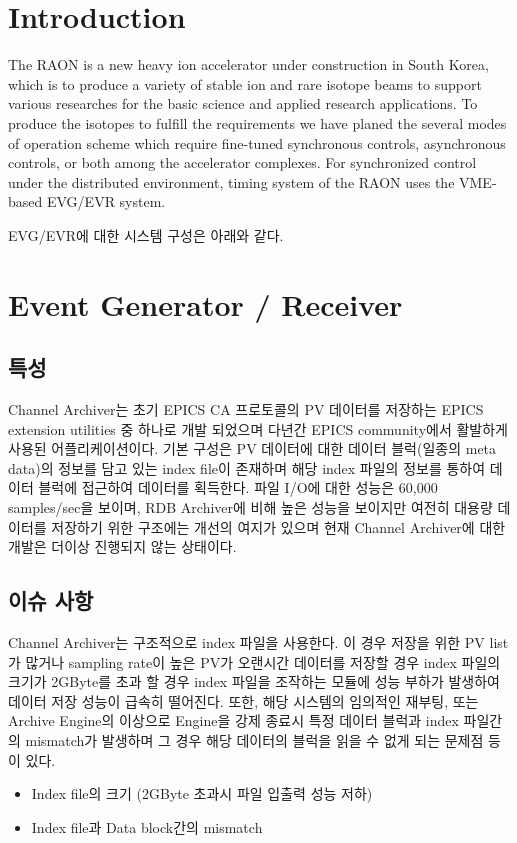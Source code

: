 \documentclass[11pt
-  , a4paper
  , article
  , oneside
]{memoir}
\begin{document}
\begin{multicols}{2}
	
	
\chapter{Introduction}
The RAON\cite{TSHOO:NIMB} is a new heavy ion accelerator under construction in South Korea, which is to produce a variety of stable ion and rare isotope beams to support various researches for the basic science and applied research applications. To produce the isotopes to fulfill the requirements we have planed the several modes of operation scheme which require fine-tuned synchronous controls, asynchronous controls, or both among the accelerator complexes. For synchronized control under the distributed environment, timing system of the RAON uses the VME-based EVG/EVR system. 

EVG/EVR에 대한 시스템 구성은 아래와 같다.



\chapter{Event Generator / Receiver}
\section{특성}
Channel Archiver\cite{archiver}는 초기 EPICS CA 프로토콜의 PV 데이터를 저장하는 EPICS extension utilities 중 하나로 개발 되었으며 다년간 EPICS community에서 활발하게 사용된 어플리케이션이다. 기본 구성은 PV 데이터에 대한 데이터 블럭(일종의 meta data)의 정보를 담고 있는 index file이 존재하며 해당 index 파일의 정보를 통하여 데이터 블럭에 접근하여 데이터를 획득한다. 파일 I/O에 대한 성능은 60,000 samples/sec을 보이며, RDB Archiver에 비해 높은 성능을 보이지만 여전히 대용량 데이터를 저장하기 위한 구조에는 개선의 여지가 있으며 현재 Channel Archiver에 대한 개발은 더이상 진행되지 않는 상태이다.
\section{이슈 사항}
Channel Archiver\cite{archiver}는 구조적으로 index 파일을 사용한다. 이 경우 저장을 위한 PV list가 많거나 sampling rate이 높은 PV가 오랜시간 데이터를 저장할 경우 index 파일의 크기가 2GByte를 초과 할 경우 index 파일을 조작하는 모듈에 성능 부하가 발생하여 데이터 저장 성능이 급속히 떨어진다. 또한, 해당 시스템의 임의적인 재부팅, 또는 Archive Engine의 이상으로 Engine을 강제 종료시 특정 데이터 블럭과 index 파일간의 mismatch가 발생하며 그 경우 해당 데이터의 블럭을 읽을 수 없게 되는 문제점 등이 있다.
\begin{itemize}
	\item Index file의 크기 (2GByte 초과시 파일 입출력 성능 저하)
	\item Index file과 Data block간의 mismatch
\end{itemize}

\end{multicols}
\end{document}
